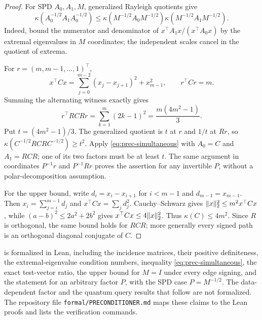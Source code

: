 \begin{proof}
For SPD $A_0,A_1,M$, generalized Rayleigh quotients give
\begin{equation}
 \kappa(A_0^{-1/2}A_1A_0^{-1/2})
 \leq\kappa(M^{-1/2}A_0M^{-1/2})
       \kappa(M^{-1/2}A_1M^{-1/2}).                       \label{eq:prec-simultaneous}
\end{equation}
Indeed, bound the numerator and denominator of
$x^\top A_1x/(x^\top A_0x)$ by the extremal eigenvalues in $M$ coordinates; the
independent scales cancel in the quotient of extrema.

For $r=(m,m-1,\ldots,1)^\top$,
\[
 x^\top Cx=\sum_{j=0}^{m-2}(x_j-x_{j+1})^2+x_{m-1}^2,
 \qquad r^\top Cr=m.
\]
Summing the alternating witness exactly gives
\[
 r^\top RCRr=\sum_{k=1}^m(2k-1)^2=\frac{m(4m^2-1)}3.
\]
Put $t=(4m^2-1)/3$.  The generalized quotient is $t$ at $r$ and
$1/t$ at $Rr$, so
$\kappa(C^{-1/2}RCRC^{-1/2})\geq t^2$.
Apply \eqref{eq:prec-simultaneous} with $A_0=C$ and $A_1=RCR$; one of its
two factors must be at least $t$.  The same argument in coordinates
$P^{-1}r$ and $P^{-1}Rr$ proves the assertion for any invertible $P$,
without a polar-decomposition assumption.

For the upper bound, write $d_i=x_i-x_{i+1}$ for $i<m-1$ and
$d_{m-1}=x_{m-1}$.  Then $x_i=\sum_{j=i}^{m-1}d_j$ and
$x^\top Cx=\sum_jd_j^2$.  Cauchy--Schwarz gives
$\lVert x\rVert_2^2\leq m^2x^\top Cx$, while
$(a-b)^2\leq2a^2+2b^2$ gives $x^\top Cx\leq4\lVert x\rVert_2^2$.
Thus $\kappa(C)\leq4m^2$.  Since $R$ is orthogonal, the same bound
holds for $RCR$; more generally every signed path is an orthogonal
diagonal conjugate of $C$.
\end{proof}

 is formalized in Lean, including the incidence
matrices, their positive definiteness, the extremal-eigenvalue condition
numbers, inequality \eqref{eq:prec-simultaneous}, the exact test-vector
ratio, the upper bound for $M=I$ under every edge signing, and the statement
for an arbitrary factor $P$, with the SPD case $P=M^{-1/2}$.  The
data-dependent factor and the quantum query results that follow are not
formalized.  The repository file \texttt{formal/PRECONDITIONER.md} maps these
claims to the Lean proofs and lists the verification commands.

